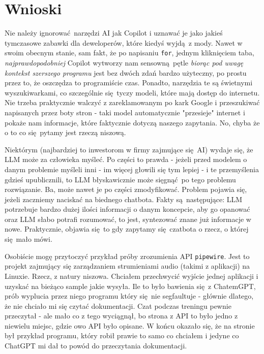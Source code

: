 	\newpage
\section{Wnioski}	%
Nie należy ignorować narzędzi AI jak Copilot i uznawać je jako jakieś tymczasowe zabawki dla deweloperów, które kiedyś wyjdą z mody. Nawet w swoim obecnym stanie, sam fakt, że po napisaniu \texttt{for}, jednym kliknięciem taba, \textit{najprawdopodobniej} Copilot wytworzy nam sensowną pętle \textit{biorąc pod uwagę kontekst szerszego programu} jest bez dwóch zdań bardzo użyteczny, po prostu przez to, że oszczędza to programiście czas. Ponadto, narzędzia te są świetnymi wyszukiwarkami, co szczególnie się tyczy modeli, które mają dostęp do internetu. Nie trzeba praktycznie walczyć z zareklamowanym po kark Google i przeszukiwać napisanych przez boty stron - taki model automatycznie "przesieje" internet i pokaże nam informacje, które faktycznie dotyczą naszego zapytania. No, chyba że o to co się pytamy jest rzeczą niszową.

Niektórym (najbardziej to inwestorom w firmy zajmujące się AI) wydaje się, że LLM może za człowieka myśleć. Po części to prawda - jeżeli przed modelem o danym problemie myśleli inni - im więcej głowili się tym lepiej - i te przemyślenia gdzieś upublicznili, to LLM błyskawicznie może sięgnąć po tego problemu rozwiązanie. Ba, może nawet je po części zmodyfikować. Problem pojawia się, jeżeli zaczniemy naciskać na biednego chatbota. Fakty są następujące: LLM potrzebuje bardzo dużej ilości informacji o danym koncepcie, aby go opanować oraz LLM słabo potrafi rozumować, to jest, syntezować znane już informacje w nowe. Praktycznie, objawia się to gdy zapytamy się czatbota o rzecz, o której się mało mówi. 

Osobiście mogę przytoczyć przykład próby zrozumienia API \texttt{pipewire}\cite{pipewiresite}. Jest to projekt zajmujący się zarządzaniem strumieniami audio (takimi z aplikacji) na Linuxie. Rzecz, z natury niszowa. Chciałem przechwycić wyjście jednej aplikacji i uzyskać na bieżąco sample jakie wysyła. Ile to było bawienia się z ChatemGPT, prób wyplucia przez niego programu który się nie segfaultuje - głównie dlatego, że nie chciało mi się czytać dokumentacji. Czat podczas treningu pewnie przeczytał - ale mało co z tego wyciągnął, bo strona z API to było jedno z niewielu miejsc, gdzie owo API było opisane. W końcu okazało się, że na stronie był przykład programu, który robił prawie to samo co chciałem i jedyne co ChatGPT mi dał to powód do przeczytania dokumentacji. 

